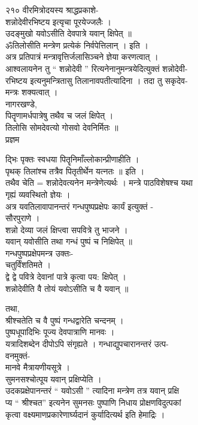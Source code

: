\documentclass[11pt, openany]{book}
\begin{document}
{{{{{{{{{{{{२१० वीरमित्रोदयस्य श्राद्धप्रकाशे-}{\\
शन्नोदेवीरभिष्टय इत्यृचा पूरयेज्जलैः ।\\
उदङ्मुखो यवोऽसीति देवपात्रे यवान् क्षिपेत् ॥\\
ॐतिलोसीति मन्त्रेण प्रत्येकं निर्वपेत्तिलान् । इति ।\\
अत्र प्रतिपात्रं मन्त्रावृत्तिर्जलासिञ्चने ज्ञेया करणत्वात् ।\\
आश्वलायनेन तु `` शन्नोदेवी '' रित्यनेनानुमन्त्रयेदित्युक्तं शन्नोदेवी-\\
रभिष्टय इत्यनुमन्त्रितासु तिलानावपतीत्यादिना । तदा तु सकृदेव-\\
मन्त्रः शक्यत्वात् ।\\
नागरखण्डे,\\
पितॄणामर्धपात्रेषु तथैव च जलं क्षिपेत् ।\\
तिलोसि सोमदेवत्यो गोसवो देवनिर्मितः ॥\\
}{प्रज्ञम}{द्भिः पृक्तः स्वधया पितॄनिमाँल्लोकान्प्रीणाहीति ।\\
पृथक् तिलांश्च तत्रैव पितृतीर्थेन यत्नतः ॥ इति ।\\
तथैव चेति = शन्नोदेवत्यनेन मन्त्रेणेत्यर्थः । मन्त्रे पाठविशेषश्च यथा\\
गृह्यं व्यवस्थितो ज्ञेयः ।\\
अत्र यवतिलावापानन्तरं गन्धपुष्पप्रक्षेपः कार्यं इत्युक्तं -\\
सौरपुराणे ।\\
शन्नो देव्या जलं क्षिप्त्वा सपवित्रे तु भाजने ।\\
यवान् यवोसीति तथा गन्धं पुष्पं च निक्षिपेत् ॥\\
गन्धपुष्पप्रक्षेपमन्त्र उक्तः-\\
चतुर्विंशतिमते ।\\
द्वे द्वे पवित्रे देवानां पात्रे कृत्वा पय: क्षिपेत् ।\\
शन्नोदेवीति वै तोयं यवोऽसीति च वै यवान् ॥

{तथा,\\
श्रीश्चतेति च वै पुष्पं गन्धद्वारेति चन्दनम् ।\\
पुष्पधूपादिभिः पूज्य देवपात्राणि मानवः ।\\
यत्रादिशब्देन दीपोऽपि संगृह्यते । गन्धाद्युपचारानन्तरं उत्प-\\
वनमुक्तं-\\
मानवे मैत्रायणीयसूत्रे ।\\
सुमनसश्चोत्पूय यवान् प्रक्षिप्येति ।\\
उदकप्रक्षेपानन्तरं `` यवोऽसी '' त्यादिना मन्त्रेण तत्र यवान् प्रक्षि\\
प्य `` श्रीश्चत'' इत्यनेन सुमनसः पुष्पाणि निधाय प्रोक्षणविदुत्पकां\\
कृत्वा वक्ष्यमाणप्रकारेणार्घ्यदानं कुर्यादित्यर्थ इति हेमाद्रिः ।

}}}}}}}}}}}}}
\end{document}
